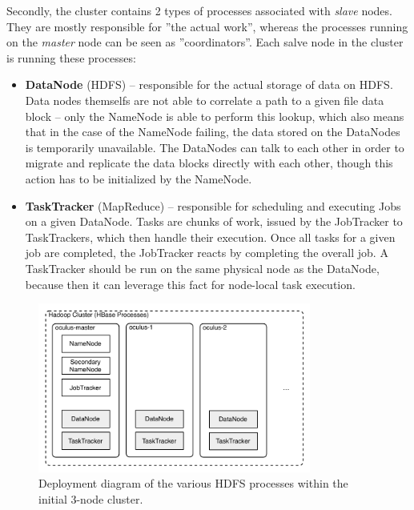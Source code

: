 Secondly, the cluster contains 2 types of processes associated with \textit{slave} nodes. They are mostly responsible for ''the actual work'', whereas the processes running on the \textit{master} node can be seen as ''coordinators''. Each salve node in the cluster is running these processes:

\begin{itemize}
  \item \textbf{DataNode} (HDFS) -- responsible for the actual storage of data on HDFS. Data nodes themselfs are not able 
                                    to correlate a path to a given file data block -- only the NameNode is able to 
                                    perform this lookup, which also means that in the case of the NameNode failing,
                                    the data stored on the DataNodes is temporarily unavailable. The DataNodes can talk 
                                    to each other in order to migrate and replicate the data blocks directly with each
                                    other, though this action has to be initialized by the NameNode.
  
  \item \textbf{TaskTracker} (MapReduce) -- responsible for scheduling and executing Jobs on a given DataNode. Tasks are
                                            chunks of work, issued by the JobTracker to TaskTrackers, which then handle
                                            their execution. Once all tasks for a given job are completed, the JobTracker 
                                            reacts by completing the overall job. A TaskTracker should be run on the same
                                            physical node as the DataNode, because then it can leverage this fact for
                                            node-local task execution.
\end{itemize}


\begin{figure}[ch!]
  \centering
  \includegraphics[width=0.8\textwidth]{img/hdfs-processes}
  \caption{Deployment diagram of the various HDFS processes within the initial 3-node cluster.}
  \label{fig:small-cluster-deployment}
\end{figure}

